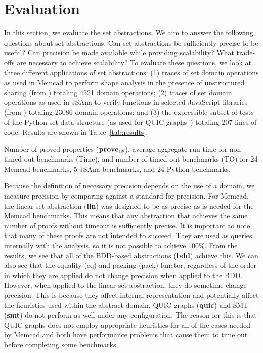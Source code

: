 \section{Evaluation}
\label{sec:evaluation}

In this section, we evaluate the set abstractions.  We aim to answer the following questions about set abstractions. Can set abstractions be sufficiently precise to be useful? Can precision be made available while providing scalability? What trade-offs are necessary to achieve scalability?  To evaluate these questions, we look at three different applications of set abstractions: (1) traces of set domain operations as used in Memcad to perform shape analysis in the presence of unstructured sharing (from \cite{memcad:15:sas}) totaling 4521 domain operations; (2) traces of set domain operations as used in JSAna to verify functions in selected JavaScript libraries (from \cite{hoo:14:sas,desync:15:esop}) totaling 23086 domain operations; and (3) the expressible subset of tests of the Python set data structure (as used for QUIC graphs~\cite{ab:ecoop:13}) totaling 207 lines of code.  Results are shown in Table~\ref{tab:results}.

\begin{table}[t]
    \caption{Number of proved properties ($\textbf{prove}_{{\mathbb{D}}^{\sharp}}$), average aggregate run time for non-timed-out benchmarks (Time), and number of timed-out benchmarks (TO) for 24 Memcad benchmarks, 5 JSAna benchmarks, and 24 Python benchmarks.}
    \label{tab:results}
    
\end{table}

Because the definition of necessary precision depends on the use of a domain, we measure precision by comparing against a standard for precision.  For Memcad, the linear set abstraction (\textbf{lin}) was designed to be as precise as is needed for the Memcad benchmarks.  This means that any abstraction that achieves the same number of proofs without timeout is sufficiently precise.  It is important to note that many of these proofs are not intended to succeed.  They are used as queries internally with the analysis, so it is not possible to achieve 100\%.  From the results, we see that all of the BDD-based abstractions (\textbf{bdd}) achieve this.  We can also see that the equality (eq) and packing (pack) functor, regardless of the order in which they are applied do not change precision when applied to the BDD.  However, when applied to the linear set abstraction, they do sometime change precision.  This is because they affect internal representation and potentially affect the heuristics used within the abstract domain.  QUIC graphs (\textbf{quic}) and SMT (\textbf{smt}) do not perform as well under any configuration.  The reason for this is that QUIC graphs does not employ appropriate heuristics for all of the cases needed by Memcad and both have performance problems that cause them to time out before completing some benchmarks.

